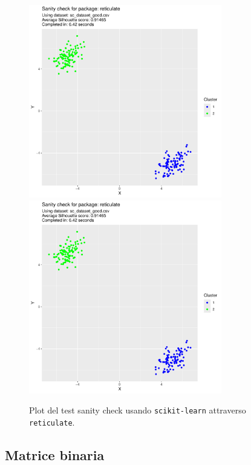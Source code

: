 \documentclass[italian]{article}
\begin{document}
			\begin{figure}[h]
				\centering
				\includegraphics[width = 0.75\textwidth, height = 0.45\textheight, page = 1]{results/results_RETICULATE.pdf}
				\includegraphics[width = 0.75\textwidth, height = 0.45\textheight, page = 2]{results/results_RETICULATE.pdf}
				\caption{Plot del test sanity check usando \texttt{scikit-learn} attraverso
				\texttt{reticulate}.}
				\label{fig:reticulate}
			\end{figure}

		\subsection{Matrice binaria}
\end{document}
